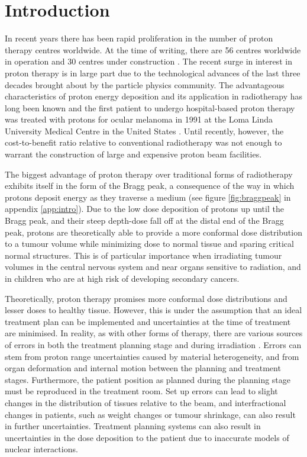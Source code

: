 \documentclass[11pt,a4paper]{article}
\begin{document}
\section{Introduction}
In recent years there has been rapid proliferation in the number of proton therapy centres worldwide. At the time of writing, there are 56 centres worldwide in operation and 30 centres under construction \cite{ptcog}. The recent surge in interest in proton therapy is in large part due to the technological advances of the last three decades brought about by the particle physics community. The advantageous characteristics of proton energy deposition and its application in radiotherapy has long been known \cite{wilson1946radiological} and the first patient to undergo hospital-based proton therapy was treated with protons for ocular melanoma in 1991 at the Loma Linda University Medical Centre in the United States \cite{schulte2012new}. Until recently, however, the cost-to-benefit ratio relative to conventional radiotherapy was not enough to warrant the construction of large and expensive proton beam facilities.

The biggest advantage of proton therapy over traditional forms of radiotherapy exhibits itself in the form of the Bragg peak, a consequence of the way in which protons deposit energy as they traverse a medium (see figure \ref{fig:braggpeak} in appendix \ref{app:intro}). Due to the low dose deposition of protons up until the Bragg peak, and their steep depth-dose fall off at the distal end of the Bragg peak, protons are theoretically able to provide a more conformal dose distribution to a tumour volume while minimizing dose to normal tissue and sparing critical normal structures. This is of particular importance when irradiating tumour volumes in the central nervous system and near organs sensitive to radiation, and in children who are at high risk of developing secondary cancers.

Theoretically, proton therapy promises more conformal dose distributions and lesser doses to healthy tissue. However, this is under the assumption that an ideal treatment plan can be implemented and uncertainties at the time of treatment are minimised. In reality, as with other forms of therapy, there are various sources of errors in both the treatment planning stage and during irradiation \cite{erdelyi2011some,knopf2013vivo}. Errors can stem from proton range uncertainties caused by material heterogeneity, and from organ deformation and internal motion between the planning and treatment stages. Furthermore, the patient position as planned during the planning stage must be reproduced in the treatment room. Set up errors can lead to slight changes in the distribution of tissues relative to the beam, and interfractional changes in patients, such as weight changes or tumour shrinkage, can also result in further uncertainties. Treatment planning systems can also result in uncertainties in the dose deposition to the patient due to inaccurate models of nuclear interactions.
\end{document}
